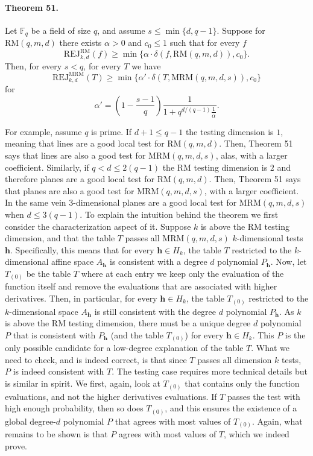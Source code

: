 \documentclass[10pt,a4paper]{article}
\begin{document}
\paragraph{Theorem 51.} Let $\mathbb F_q$ be a field of size $q$, and assume $s\leq\min\{d,q-1\}$. Suppose for $\mathrm{RM}(q,m,d)$ there exists $\alpha>0$ and $c_0\leq1$ such that for every $f$
\[\mathrm{REJ}_{k,d}^{\mathrm{RM}}(f)\geq\min\{\alpha\cdot\delta(f,\mathrm{RM}(q,m,d)),c_0\}.\]
Then, for every $s<q$, for every $T$ we have
\[\mathrm{REJ}_{k,d}^{\mathrm{MRM}}(T)\geq\min\{\alpha'\cdot\delta(T,\mathrm{MRM}(q,m,d,s)),c_0\}\tag{6}\]
for
\[\alpha'=\left(1-\frac{s-1}{q}\right)\frac1{1+q^{d/(q-1)}\frac1\alpha}.\tag{7}\]

For example, assume $q$ is prime. If $d+1\leq q-1$ the testing dimension is $1$, meaning that lines are a good local test for $\mathrm{RM}(q,m,d)$. Then, Theorem 51 says that lines are also a good test for $\mathrm{MRM}(q,m,d,s)$, alas, with a larger coefficient. Similarly, if $q<d\leq2(q-1)$ the RM testing dimension is $2$ and therefore planes are a good local test for $\mathrm{RM}(q,m,d)$. Then, Theorem 51 says that planes are also a good test for $\mathrm{MRM}(q,m,d,s)$, with a larger coefficient. In the same vein 3-dimensional planes are a good local test for $\mathrm{MRM}(q,m,d,s)$ when $d\leq3(q-1)$.
To explain the intuition behind the theorem we first consider the characterization aspect of it. Suppose $k$ is above the RM testing dimension, and that the table $T$ passes all $\mathrm{MRM}(q,m,d,s)$ $k$-dimensional tests $\boldsymbol h$. Specifically, this means that for every $\boldsymbol h\in H_k$, the table $T$ restricted to the $k$-dimensional affine space $A_{\boldsymbol h}$ is consistent with a degree $d$ polynomial $P_{\boldsymbol h}$. Now, let $T_{(0)}$ be the table $T$ where at each entry we keep only the evaluation of the function itself and remove the evaluations that are associated with higher derivatives. Then, in particular, for every $\boldsymbol h\in H_k$, the table $T_{(0)}$ restricted to the $k$-dimensional space $A_{\boldsymbol h}$ is still consistent with the degree $d$ polynomial $P_{\boldsymbol h}$. As $k$ is above the RM testing dimension, there must be a unique degree $d$ polynomial $P$ that is consistent with $P_{\boldsymbol h}$ (and the table $T_{(0)}$) for every $\boldsymbol h\in H_k$. This $P$ is the only possible candidate for a low-degree explanation of the table $T$. What we need to check, and is indeed correct, is that since $T$ passes all dimension $k$ tests, $P$ is indeed consistent with $T$.
The testing case requires more technical details but is similar in spirit. We first, again, look at $T_{(0)}$ that contains only the function evaluations, and not the higher derivatives evaluations. If $T$ passes the test with high enough probability, then so does $T_{(0)}$, and this ensures the existence of a global degree-$d$ polynomial $P$ that agrees with most values of $T_{(0)}$. Again, what remains to be shown is that $P$ agrees with most values of $T$, which we indeed prove.
\end{document}
